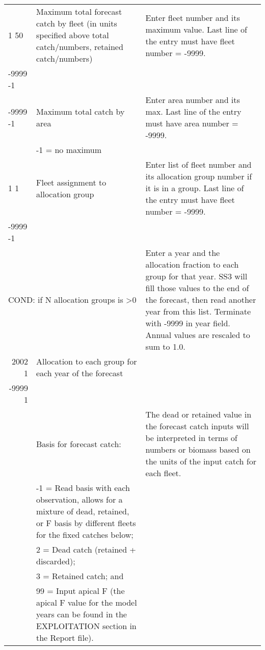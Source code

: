 \begin{landscape}
{\begin{longtable}{p{3.2cm} p{7cm} p{10.8cm}}
  \hline
  1 50 & Maximum total forecast catch by fleet (in units specified above total catch/numbers, retained catch/numbers) & \multirow{1}{1cm}[-0.25cm]{\parbox{11cm}{Enter fleet number and its maximum value. Last line of the entry must have fleet number = -9999.}} \Tstrut\\
  -9999 -1 & & \Bstrut\\
  \hline
  
  -9999 -1 & Maximum total catch by area & \multirow{1}{1cm}[-0.25cm]{\parbox{11cm}{Enter area number and its max. Last line of the entry must have area number = -9999.}} \Tstrut\\
     & -1 = no maximum & \Bstrut\\
     
  \hline
  1 1  & Fleet assignment to allocation group & \multirow{1}{1cm}[-0.25cm]{\parbox{11cm}{Enter list of fleet number and its allocation group number if it is in a group. Last line of the entry must have fleet number = -9999.}} \Tstrut\\
  -9999 -1  & &  \Bstrut\\ 
    
  \multicolumn{2}{l}{COND: if N allocation groups is >0 } & \multirow{1}{1cm}[-0.25cm]{\parbox{11cm}{ Enter a year and the allocation fraction to each group for that year.  SS3 will fill those values to the end of the forecast, then read another year from this list.  Terminate with -9999 in year field. Annual values are rescaled to sum to 1.0.}} \Tstrut \\
  \multicolumn{1}{r}{2002 1}  & Allocation to each group for each year of the forecast & \\
  \multicolumn{1}{r}{-9999 1} & & \Bstrut\\
  
  
  \pagebreak
    -1 & Basis for forecast catch: & \multirow{1}{1cm}[-0.25cm]{\parbox{11cm}{ The dead or retained value in the forecast catch inputs will be interpreted in terms of numbers or biomass based on the units of the input catch for each fleet. }}\Tstrut\\
    & -1 = Read basis with each observation, allows for a mixture of dead, retained, or F basis by different fleets for the fixed catches below; & \\
    & 2 = Dead catch (retained + discarded); & \\
    & 3 = Retained catch; and & \\
    & 99 = Input apical F (the apical F value for the model years can be found in the EXPLOITATION section in the Report file). & \Bstrut\\
    

\end{longtable}}
\end{landscape}

